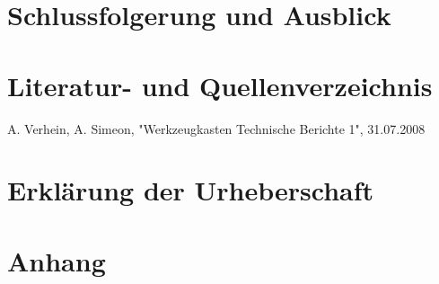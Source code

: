 \documentclass[a4paper,10pt]{scrreprt}
\begin{document}
\section{Schlussfolgerung und Ausblick}
\section{Literatur- und Quellenverzeichnis}
A. Verhein, A. Simeon, "Werkzeugkasten Technische Berichte 1", 31.07.2008

\section{Erklärung der Urheberschaft}
\section{Anhang}
\end{document}
